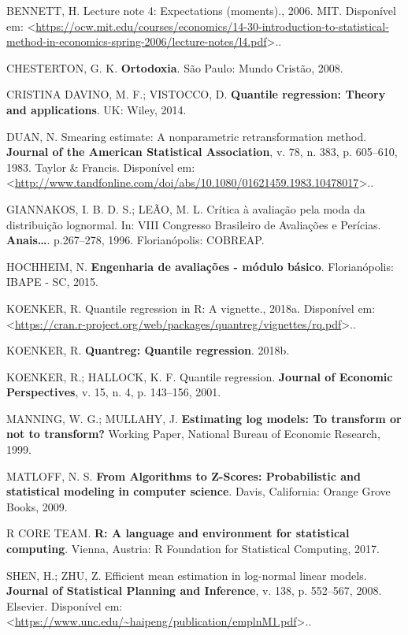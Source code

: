 \documentclass[a4paper]{article}
\begin{document}
\hypertarget{ref-bennett}{}
BENNETT, H. Lecture note 4: Expectations (moments)., 2006. MIT.
Disponível em:
\textless{}\url{https://ocw.mit.edu/courses/economics/14-30-introduction-to-statistical-method-in-economics-spring-2006/lecture-notes/l4.pdf}\textgreater{}..

\hypertarget{ref-gkchesterton}{}
CHESTERTON, G. K. \textbf{Ortodoxia}. São Paulo: Mundo Cristão, 2008.

\hypertarget{ref-QR}{}
CRISTINA DAVINO, M. F.; VISTOCCO, D. \textbf{Quantile regression: Theory
and applications}. UK: Wiley, 2014.

\hypertarget{ref-Duan}{}
DUAN, N. Smearing estimate: A nonparametric retransformation method.
\textbf{Journal of the American Statistical Association}, v. 78, n. 383,
p. 605--610, 1983. Taylor \& Francis. Disponível em:
\textless{}\url{http://www.tandfonline.com/doi/abs/10.1080/01621459.1983.10478017}\textgreater{}..

\hypertarget{ref-giannakos}{}
GIANNAKOS, I. B. D. S.; LEÃO, M. L. Crítica à avaliação pela moda da
distribuição lognormal. In: VIII Congresso Brasileiro de Avaliações e
Perícias. \textbf{Anais\ldots{}}. p.267--278, 1996. Florianópolis:
COBREAP.

\hypertarget{ref-hochheim}{}
HOCHHEIM, N. \textbf{Engenharia de avaliações - módulo básico}.
Florianópolis: IBAPE - SC, 2015.

\hypertarget{ref-quantregvignette}{}
KOENKER, R. Quantile regression in R: A vignette., 2018a. Disponível em:
\textless{}\url{https://cran.r-project.org/web/packages/quantreg/vignettes/rq.pdf}\textgreater{}..

\hypertarget{ref-quantreg}{}
KOENKER, R. \textbf{Quantreg: Quantile regression}. 2018b.

\hypertarget{ref-koenker}{}
KOENKER, R.; HALLOCK, K. F. Quantile regression. \textbf{Journal of
Economic Perspectives}, v. 15, n. 4, p. 143--156, 2001.

\hypertarget{ref-NBERt0246}{}
MANNING, W. G.; MULLAHY, J. \textbf{Estimating log models: To transform
or not to transform?} Working Paper, National Bureau of Economic
Research, 1999.

\hypertarget{ref-matloff2009}{}
MATLOFF, N. S. \textbf{From Algorithms to Z-Scores: Probabilistic and
statistical modeling in computer science}. Davis, California: Orange
Grove Books, 2009.

\hypertarget{ref-R}{}
R CORE TEAM. \textbf{R: A language and environment for statistical
computing}. Vienna, Austria: R Foundation for Statistical Computing,
2017.

\hypertarget{ref-shen}{}
SHEN, H.; ZHU, Z. Efficient mean estimation in log-normal linear models.
\textbf{Journal of Statistical Planning and Inference}, v. 138, p.
552--567, 2008. Elsevier. Disponível em:
\textless{}\url{https://www.unc.edu/~haipeng/publication/emplnM1.pdf}\textgreater{}..
\end{document}
